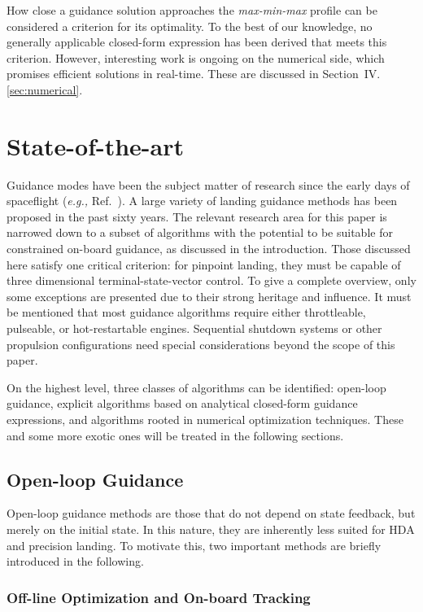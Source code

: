 \documentclass[%
]{aiaa-tc}
\begin{document}
How close a guidance solution approaches the \emph{max-min-max} profile can be
considered a criterion for its optimality. To the best of our knowledge, no
generally applicable closed-form expression has been derived that meets this
criterion. However, interesting work is ongoing on the numerical side, which
promises efficient solutions in real-time. These are discussed in
Section~IV.\ref{sec:numerical}.


\section{State-of-the-art}

Guidance modes have been the subject matter of research since the early days of
spaceflight (\emph{e.g.,} Ref.~). A large variety of landing
guidance methods has been proposed in the past sixty years. The relevant
research area for this paper is narrowed down to a subset of algorithms with the
potential to be suitable for constrained on-board guidance, as discussed in the
introduction. Those discussed here satisfy one critical criterion: for pinpoint
landing, they must be capable of three dimensional terminal-state-vector
control. To give a complete overview, only some exceptions are presented due to
their strong heritage and influence. It must be mentioned that most guidance
algorithms require either throttleable, pulseable, or hot-restartable engines.
Sequential shutdown systems or other propulsion configurations need special
considerations beyond the scope of this paper.

On the highest level, three classes of algorithms can be identified: open-loop
guidance, explicit algorithms based on analytical closed-form guidance
expressions, and algorithms rooted in numerical optimization techniques. These
and some more exotic ones will be treated in the following sections.


\subsection{Open-loop Guidance}

Open-loop guidance methods are those that do not depend on state feedback, but
merely on the initial state. In this nature, they are inherently less suited for
HDA and precision landing. To motivate this, two important methods are briefly
introduced in the following.


\subsubsection{Off-line Optimization and On-board Tracking}
\end{document}
